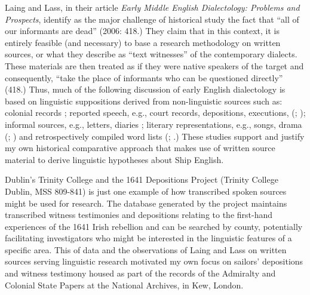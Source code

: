 Laing and Lass, in their article \textit{Early Middle English Dialectology: Problems and Prospects}, identify as the major challenge of historical  study the fact that “all of our informants are dead” (2006: 418.) They claim that in this context, it is entirely feasible (and necessary) to base a research methodology on written sources, or what they describe as “text witnesses” of the contemporary dialects. These materials are then treated as if they were native speakers of the target  and consequently, “take the place of informants who can be questioned directly” (418.) Thus, much of the following discussion of early English dialectology is based on linguistic suppositions derived from non-linguistic sources such as: colonial records \citep{Maynor1988}; reported speech, e.g., court records, depositions, executions, (\citealt{Awbery1988}; \citealt{Tagliamonte2013}); informal sources, e.g., letters, diaries \citep{Tagliamonte2013}; literary representations, e.g., songs, drama (\citealt{Russell1883}; \citealt{Wright1967}) and retrospectively compiled word lists (\citealt{Wright1967}; \citealt{Smith1968}.) These studies support and justify my own historical comparative approach that makes use of written source material to derive linguistic hypotheses about Ship English. 

Dublin’s Trinity College and the 1641 Depositions Project (Trinity College Dublin, MSS 809-841) is just one example of how transcribed spoken sources might be used for research. The database generated by the project maintains transcribed witness testimonies and depositions relating to the first-hand experiences of the 1641 Irish rebellion and can be searched by county, potentially facilitating investigators who might be interested in the linguistic features of a specific area. This  of data and the observations of Laing and Lass on written sources serving linguistic research motivated my own focus on sailors’ depositions and witness testimony housed as part of the records of the Admiralty and Colonial State Papers at the National Archives, in Kew, London. 

